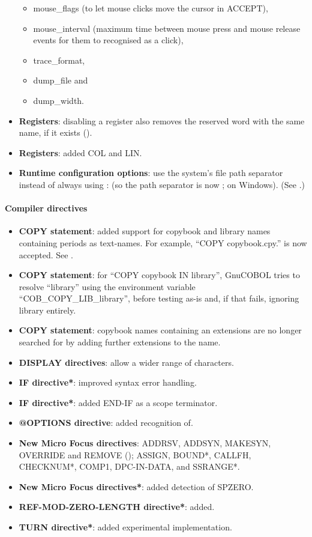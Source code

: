 \begin{itemize}
\begin{itemize}
  \item mouse\_flags (to let mouse clicks move the cursor in ACCEPT),
  \item mouse\_interval (maximum time between mouse press and mouse release events for them to recognised as a click),
  \item trace\_format,
  \item dump\_file and
  \item dump\_width.
  \end{itemize}
\item \textbf{Registers}: disabling a register also removes the reserved word with the same name, if it exists ().
\item \textbf{Registers}: added COL and LIN.
\item \textbf{Runtime configuration options}: use the system's file path separator instead of always using : (so the path separator is now ; on Windows). (See .)
\end{itemize}

\paragraph{Compiler directives}
\begin{itemize}
\item \textbf{COPY statement}: added support for copybook and library names containing periods as text-names. For example,  ``COPY copybook.cpy.'' is now accepted. See .
\item \textbf{COPY statement}: for ``COPY copybook IN library'', GnuCOBOL tries to resolve ``library'' using the environment variable ``COB\_COPY\_LIB\_library'', before testing as-is and, if that fails, ignoring library entirely.
\item \textbf{COPY statement}: copybook names containing an extensions are no longer searched for by adding further extensions to the name.
\item \textbf{DISPLAY directives}: allow a wider range of characters.
\item \textbf{\directiveindicator{}IF directive*}: improved syntax error handling.
\item \textbf{\textdollar{}IF directive*}: added \textdollar{}END-IF as a scope terminator.
\item \textbf{@OPTIONS directive}: added recognition of.
\item \textbf{New Micro Focus directives}: ADDRSV, ADDSYN, MAKESYN, OVERRIDE and REMOVE (); ASSIGN, BOUND*, CALLFH, CHECKNUM*, COMP1, DPC-IN-DATA, and SSRANGE*.
\item \textbf{New Micro Focus directives*}: added detection of SPZERO.
\item \textbf{\directiveindicator{}REF-MOD-ZERO-LENGTH directive*}: added.
\item \textbf{\directiveindicator{}TURN directive*}: added experimental implementation.
\end{itemize}


